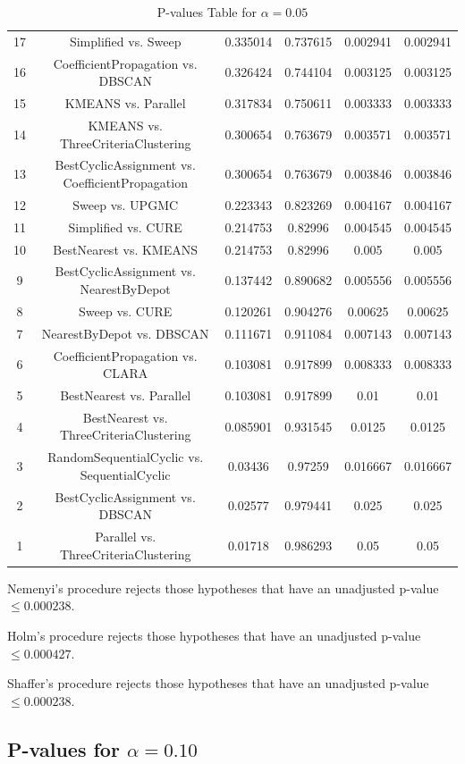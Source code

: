 \documentclass[a4paper,10pt]{article}
\begin{document}
\begin{landscape}
\begin{table}[!htp]
\begin{tabular}{cccccc}
17&Simplified vs. Sweep&0.335014&0.737615&0.002941&0.002941\\
16&CoefficientPropagation vs. DBSCAN&0.326424&0.744104&0.003125&0.003125\\
15&KMEANS vs. Parallel&0.317834&0.750611&0.003333&0.003333\\
14&KMEANS vs. ThreeCriteriaClustering&0.300654&0.763679&0.003571&0.003571\\
13&BestCyclicAssignment vs. CoefficientPropagation&0.300654&0.763679&0.003846&0.003846\\
12&Sweep vs. UPGMC&0.223343&0.823269&0.004167&0.004167\\
11&Simplified vs. CURE&0.214753&0.82996&0.004545&0.004545\\
10&BestNearest vs. KMEANS&0.214753&0.82996&0.005&0.005\\
9&BestCyclicAssignment vs. NearestByDepot&0.137442&0.890682&0.005556&0.005556\\
8&Sweep vs. CURE&0.120261&0.904276&0.00625&0.00625\\
7&NearestByDepot vs. DBSCAN&0.111671&0.911084&0.007143&0.007143\\
6&CoefficientPropagation vs. CLARA&0.103081&0.917899&0.008333&0.008333\\
5&BestNearest vs. Parallel&0.103081&0.917899&0.01&0.01\\
4&BestNearest vs. ThreeCriteriaClustering&0.085901&0.931545&0.0125&0.0125\\
3&RandomSequentialCyclic vs. SequentialCyclic&0.03436&0.97259&0.016667&0.016667\\
2&BestCyclicAssignment vs. DBSCAN&0.02577&0.979441&0.025&0.025\\
1&Parallel vs. ThreeCriteriaClustering&0.01718&0.986293&0.05&0.05\\
\hline
\end{tabular}
\caption{P-values Table for $\alpha=0.05$}
\end{table}Nemenyi's procedure rejects those hypotheses that have an unadjusted p-value $\le0.000238$.

Holm's procedure rejects those hypotheses that have an unadjusted p-value $\le0.000427$.

Shaffer's procedure rejects those hypotheses that have an unadjusted p-value $\le0.000238$.

\pagebreak

\subsection{P-values for $\alpha=0.10$}


\end{landscape}
\end{document}
